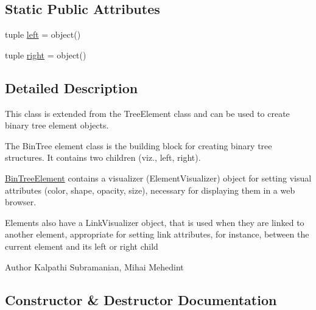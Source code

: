 \subsection*{Static Public Attributes}
\begin{DoxyCompactItemize}
\item 
tuple \hyperlink{class_bridges_1_1bin__tree__element_1_1_bin_tree_element_ae71553e3888615cdeb6fd8487045653c}{left} = object()
\item 
tuple \hyperlink{class_bridges_1_1bin__tree__element_1_1_bin_tree_element_acae42ce2d77e073ea539893c86103c17}{right} = object()
\end{DoxyCompactItemize}


\subsection{Detailed Description}
This class is extended from the Tree\+Element class and can be used to create binary tree element objects. 

The Bin\+Tree element class is the building block for creating binary tree structures. It contains two children (viz., left, right).

\hyperlink{class_bridges_1_1bin__tree__element_1_1_bin_tree_element}{Bin\+Tree\+Element} contains a visualizer (Element\+Visualizer) object for setting visual attributes (color, shape, opacity, size), necessary for displaying them in a web browser.

Elements also have a Link\+Visualizer object, that is used when they are linked to another element, appropriate for setting link attributes, for instance, between the current element and its left or right child

\begin{DoxyAuthor}{Author}
Kalpathi Subramanian, Mihai Mehedint 
\end{DoxyAuthor}


\subsection{Constructor \& Destructor Documentation}
\hypertarget{class_bridges_1_1bin__tree__element_1_1_bin_tree_element_a55f0728b5c2d4ab4788c7af6a43d3799}{}
